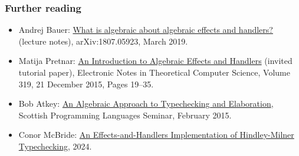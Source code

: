 \documentclass[11pt,aspectratio=169,fleqn]{beamer}
\begin{document}
\begin{frame}
  \frametitle{Further reading}

  \begin{itemize}
  \item Andrej Bauer: \href{https://doi.org/10.48550/arXiv.1807.05923}{What is algebraic about algebraic effects and handlers?} (lecture notes), arXiv:1807.05923, March 2019.

  \item Matija Pretnar: \href{https://doi.org/10.1016/j.entcs.2015.12.003}{An Introduction to Algebraic Effects and Handlers} (invited tutorial paper),
    Electronic Notes in Theoretical Computer Science, Volume 319, 21 December 2015, Pages 19--35.

  \item Bob Atkey: \href{https://bentnib.org/posts/2015-04-19-algebraic-approach-typechecking-and-elaboration.html}{An Algebraic Approach to Typechecking and Elaboration}, Scottish Programming Languages Seminar, February 2015.

  \item Conor McBride: \href{https://github.com/pigworker/Samizdat/blob/main/EffW.hs}{An Effects-and-Handlers Implementation of Hindley-Milner Typechecking}, 2024.
  \end{itemize}
\end{frame}
\end{document}
